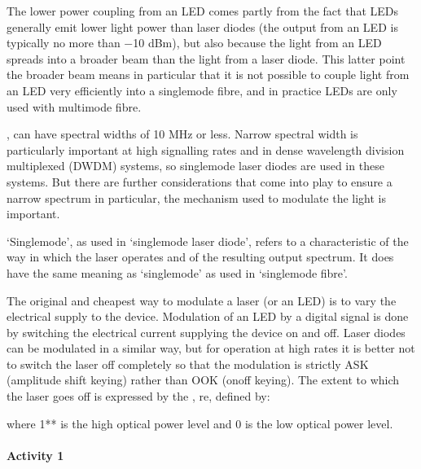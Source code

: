 \documentclass[letterpaper,10pt,english]{sphinxmanual}
\let\sphinxpxdimen\pdfpxdimen\else\newdimen\sphinxpxdimen
\begin{document}
The lower power coupling from an LED comes partly from the fact that LEDs generally emit lower light power than laser diodes (the output from an LED is typically no more than −10 dBm), but also because the light from an LED spreads into a broader beam than the light from a laser diode. This latter point \textendash{} the broader beam \textendash{} means in particular that it is not possible to couple light from an LED very efficiently into a single\sphinxhyphen{}mode fibre, and in practice LEDs are only used with multimode fibre.

, can have spectral widths of 10 MHz or less. Narrow spectral width is particularly important at high signalling rates and in dense wavelength division multiplexed (DWDM) systems, so single\sphinxhyphen{}mode laser diodes are used in these systems. But there are further considerations that come into play to ensure a narrow spectrum \textendash{} in particular, the mechanism used to modulate the light is important.

‘Single\sphinxhyphen{}mode’, as used in ‘single\sphinxhyphen{}mode laser diode’, refers to a characteristic of the way in which the laser operates and of the resulting output spectrum. It does  have the same meaning as ‘single\sphinxhyphen{}mode’ as used in ‘single\sphinxhyphen{}mode fibre’.

The original \textendash{} and cheapest \textendash{} way to modulate a laser (or an LED) is to vary the electrical supply to the device. Modulation of an LED by a digital signal is done by switching the electrical current supplying the device on and off. Laser diodes can be modulated in a similar way, but for operation at high rates it is better not to switch the laser off completely so that the modulation is strictly ASK (amplitude shift keying) rather than OOK (on\sphinxhyphen{}off keying). The extent to which the laser goes off
is expressed by the , re, defined by:

\sphinxincludegraphics[width=511\sphinxpxdimen,height=460\sphinxpxdimen]{{t305_ue010i}.gif}

where 1** is the high optical power level and 0 is the low optical power level.


\paragraph{Activity 1}
\label{\detokenize{content/session_00/Part_00_02:Activity-1}}
\end{document}
